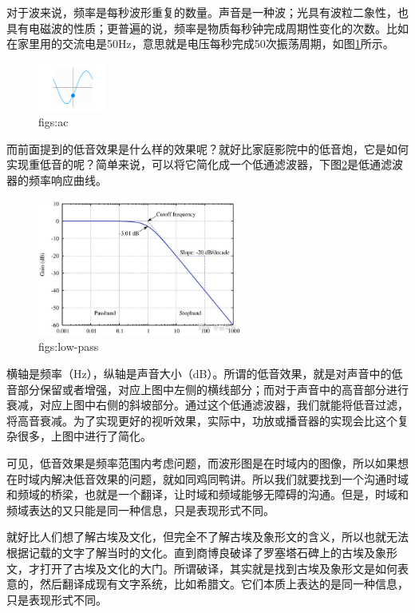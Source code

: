 \documentclass[lang=cn,11pt,a4paper,cite=numbers]{elegantpaper}
\begin{document}
  对于波来说，频率是每秒波形重复的数量。声音是一种波；光具有波粒二象性，也具有电磁波的性质；更普遍的说，频率是物质每秒钟完成周期性变化的次数。比如在家里用的交流电是50Hz，意思就是电压每秒完成50次振荡周期，如图\ref{figs:ac}所示。
\begin{figure}[!htb]
  \centering
  \includegraphics[width=0.2\textwidth]{figs/ac.png}
  \caption{figs:ac}
  \label{figs:ac}
\end{figure}

  而前面提到的低音效果是什么样的效果呢？就好比家庭影院中的低音炮，它是如何实现重低音的呢？简单来说，可以将它简化成一个低通滤波器，下图\ref{figs:low-pass}是低通滤波器的频率响应曲线。
\begin{figure}[!htb]
  \centering
  \includegraphics[width=0.6\textwidth]{figs/low-pass.png}
  \caption{figs:low-pass}
  \label{figs:low-pass}
\end{figure}
横轴是频率（Hz），纵轴是声音大小（dB）。所谓的低音效果，就是对声音中的低音部分保留或者增强，对应上图中左侧的横线部分；而对于声音中的高音部分进行衰减，对应上图中右侧的斜坡部分。通过这个低通滤波器，我们就能将低音过滤，将高音衰减。为了实现更好的视听效果，实际中，功放或播音器的实现会比这个复杂很多，上图中进行了简化。

  可见，低音效果是频率范围内考虑问题，而波形图是在时域内的图像，所以如果想在时域内解决低音效果的问题，就如同鸡同鸭讲。所以我们就要找到一个沟通时域和频域的桥梁，也就是一个翻译，让时域和频域能够无障碍的沟通。但是，时域和频域表达的又只能是同一种信息，只是表现形式不同。

  就好比人们想了解古埃及文化，但完全不了解古埃及象形文的含义，所以也就无法根据记载的文字了解当时的文化。直到商博良破译了罗塞塔石碑上的古埃及象形文，才打开了古埃及文化的大门。所谓破译，其实就是找到古埃及象形文是如何表意的，然后翻译成现有文字系统，比如希腊文。它们本质上表达的是同一种信息，只是表现形式不同。
\end{document}
